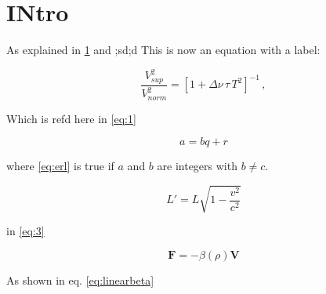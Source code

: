 \section{INtro}\label{sec:1}

As explained in \ref{sec:1} and ;sd;d
This is now an equation with a label:

\begin{equation}
\label{eq:1}
\frac{V_{ sup}^2}{V_{ norm}^2} = [1 + \Delta \nu \, \tau \, T^2 ]^{-1} \, ,
\end{equation}

Which is refd here in \ref{eq:1}

\begin{equation} \label{eq:erl}
a = bq + r
\end{equation}

where \eqref{eq:erl} is true if $a$ and $b$ are integers with $b \neq c$.

\begin{equation}
\label{eq:3}
  L' = {L}{\sqrt{1-\frac{v^2}{c^2}}}
 \end{equation}

in \ref{eq:3}

\begin{equation}
\mathbf{F} = -\beta(\rho) \mathbf{V}
\label{eq:linearbeta}
\end{equation}

As shown in eq. \ref{eq:linearbeta}

